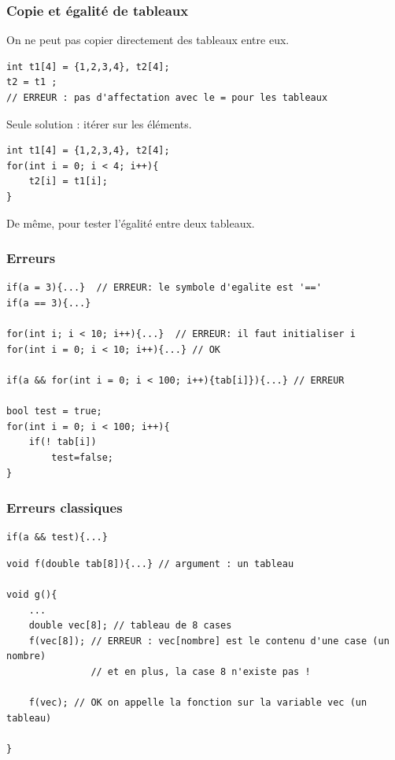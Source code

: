\begin{frame}[fragile=singleslide]
\frametitle{Copie et égalité de tableaux}
On ne peut pas copier directement des tableaux entre eux.
\begin{verbatim}
int t1[4] = {1,2,3,4}, t2[4];
t2 = t1 ;
// ERREUR : pas d'affectation avec le = pour les tableaux
\end{verbatim}

Seule solution : itérer sur les éléments.
\begin{verbatim}
int t1[4] = {1,2,3,4}, t2[4];
for(int i = 0; i < 4; i++){
    t2[i] = t1[i];
}
\end{verbatim}
De même, pour tester l'égalité entre deux tableaux.
\end{frame}

\begin{frame}[fragile=singleslide]
	\frametitle{Erreurs}
	
	\begin{verbatim}
if(a = 3){...}  // ERREUR: le symbole d'egalite est '=='
if(a == 3){...}
	
for(int i; i < 10; i++){...}  // ERREUR: il faut initialiser i
for(int i = 0; i < 10; i++){...} // OK

if(a && for(int i = 0; i < 100; i++){tab[i]}){...} // ERREUR
		
bool test = true;
for(int i = 0; i < 100; i++){
    if(! tab[i])
        test=false;
}
	\end{verbatim}
	
\end{frame}

\begin{frame}[fragile=singleslide]
	\frametitle{Erreurs classiques}
	
	\begin{verbatim}
if(a && test){...}
	\end{verbatim}
		
	\begin{verbatim}
void f(double tab[8]){...} // argument : un tableau

void g(){
    ...
    double vec[8]; // tableau de 8 cases
    f(vec[8]); // ERREUR : vec[nombre] est le contenu d'une case (un nombre)
               // et en plus, la case 8 n'existe pas !
               
    f(vec); // OK on appelle la fonction sur la variable vec (un tableau)
    
}
	\end{verbatim}
\end{frame}

